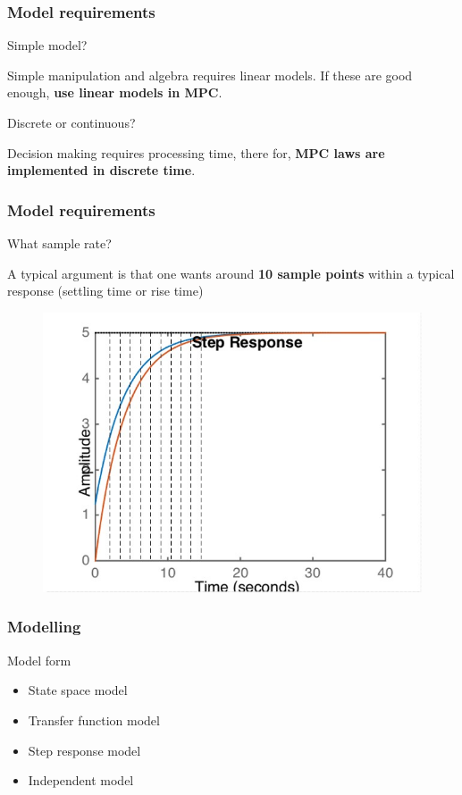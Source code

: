 \documentclass{beamer}
\begin{document}
\begin{frame}
\frametitle{Model requirements}

\begin{block}{Simple model?}

Simple manipulation and algebra requires linear models. If these are good enough, \textbf{use linear models in MPC}.

\end{block}

\begin{block}{Discrete or continuous?}
	
Decision making requires processing time, there for, \textbf{MPC laws are implemented in discrete time}.
	
\end{block}

\end{frame}

\begin{frame}
\frametitle{Model requirements}

\begin{block}{What sample rate?}
	
	A typical argument is that one wants around \textbf{10 sample points} within a typical response (settling time or rise time)
	
	\begin{figure}
		\includegraphics[width=0.6\linewidth]{Figures/sampling_time}
	\end{figure}
	
\end{block}

\end{frame}


\begin{frame}
\frametitle{Modelling}

\begin{block}{Model form}
	\begin{itemize}
		\item State space model
		\item	Transfer function model
		\item	Step response model
		\item	Independent model
	\end{itemize}
\end{block}



\end{frame}
\end{document}
